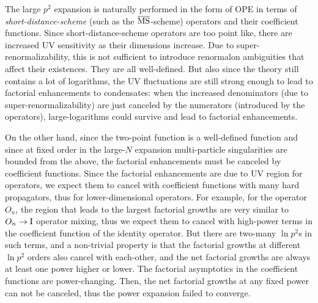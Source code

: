 \documentclass[a4paper,11pt]{article}
\begin{document}
The large $p^2$ expansion is naturally performed in the form of OPE in terms of {\it short-distance-scheme} (such as the $\overline{\rm MS}$-scheme) operators and their coefficient functions.  Since short-distance-scheme operators are too point like, there are increased UV sensitivity as their dimensions increase. Due to super-renormalizability, this is not sufficient to introduce renormalon ambiguities that affect their existences. They are all well-defined. But also since the theory still contains  a lot of logarithms, the UV fluctuations are still strong enough to lead to factorial enhancements to condensates: when the increased denominators (due to super-renormalizability) are just canceled by the numerators (introduced by the operators), large-logarithms could survive and lead to factorial enhancements.   


On the other hand, since the two-point function is a well-defined function and since at fixed order in the large-$N$ expansion multi-particle singularities are bounded from the above, the factorial enhancements must be canceled by coefficient functions. Since the factorial enhancements are due to UV region for operators, we expect them to cancel with coefficient functions with many hard propagators, thus for lower-dimensional operators. For example, for the operator $O_n$, the region that leads to the largest factorial growths are very similar to $O_n\rightarrow{\rm I}$ operator mixing, thus we expect them to cancel with high-power terms in the coefficient function of the identity operator. But there are two-many $\ln p^2$s in such terms, and a non-trivial property is that the factorial growths at different $\ln p^2$ orders also cancel with each-other, and the net factorial growths are always at least one power higher or lower. The factorial asymptotics in the coefficient functions are power-changing. Then, the net factorial growths at any fixed power can not be canceled, thus the power expansion failed to converge. 
\end{document}
